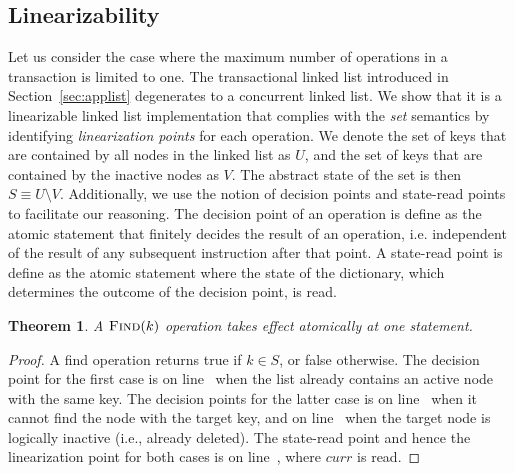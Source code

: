 \documentclass[10pt,conference,compsocconf]{IEEEtran}
\newtheorem{theorem}{Theorem}
\begin{document}
\subsection{Linearizability}
Let us consider the case where the maximum number of operations in a transaction is limited to one.
The transactional linked list introduced in Section~\ref{sec:applist} degenerates to a concurrent linked list.
We show that it is a linearizable linked list implementation that complies with the \emph{set} semantics by identifying \emph{linearization points} for each operation.
We denote the set of keys that are contained by all nodes in the linked list as $U$, and the set of keys that are contained by the inactive nodes as $V$.
The abstract state of the set is then $S \equiv U \setminus V$.
Additionally, we use the notion of decision points and state-read points to facilitate our reasoning. 
The decision point of an operation is define as the atomic statement that finitely decides the result of an operation, i.e. independent of the result of any subsequent instruction after that point.
A state-read point is define as the atomic statement where the state of the dictionary, which determines the outcome of the decision point, is read.

\begin{theorem}
    A $\textsc{Find}(k)$ operation takes effect atomically at one statement.
\end{theorem}
\begin{proof}
    A find operation returns true if $k \in S$, or false otherwise.  
    The decision point for the first case is on line~ when the list already contains an active node with the same key.
    The decision points for the latter case is on line~ when it cannot find the node with the target key, and on line~ when the target node is logically inactive (i.e., already deleted).
    The state-read point and hence the linearization point for both cases is on line~, where $curr$ is read.
\end{proof}
\end{document}
